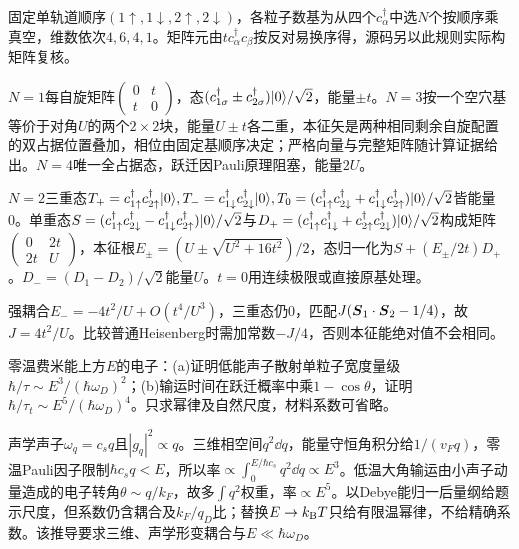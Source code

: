\begin{solution}
固定单轨道顺序$(1\uparrow,1\downarrow,2\uparrow,2\downarrow)$，各粒子数基为从四个$c_\alpha^\dagger$中选$N$个按顺序乘真空，维数依次$4,6,4,1$。矩阵元由$tc_\alpha^\dagger c_\beta$按反对易换序得，源码另以此规则实际构矩阵复核。

$N=1$每自旋矩阵$\left(\begin{smallmatrix}0&t\\t&0\end{smallmatrix}\right)$，态$(c_{1\sigma}^\dagger\pm c_{2\sigma}^\dagger)\lvert 0\rangle/\sqrt2$，能量$\pm t$。$N=3$按一个空穴基等价于对角$U$的两个$2\times2$块，能量$U\pm t$各二重，本征矢是两种相同剩余自旋配置的双占据位置叠加，相位由固定基顺序决定；严格向量与完整矩阵随计算证据给出。$N=4$唯一全占据态，跃迁因Pauli原理阻塞，能量$2U$。

$N=2$三重态$T_+=c_{1\uparrow}^\dagger c_{2\uparrow}^\dagger\lvert 0\rangle,T_-=c_{1\downarrow}^\dagger c_{2\downarrow}^\dagger\lvert 0\rangle,T_0=(c_{1\uparrow}^\dagger c_{2\downarrow}^\dagger+c_{1\downarrow}^\dagger c_{2\uparrow}^\dagger)\lvert 0\rangle/\sqrt2$皆能量0。单重态$S=(c_{1\uparrow}^\dagger c_{2\downarrow}^\dagger-c_{1\downarrow}^\dagger c_{2\uparrow}^\dagger)\lvert 0\rangle/\sqrt2$与$D_+=(c_{1\uparrow}^\dagger c_{1\downarrow}^\dagger+c_{2\uparrow}^\dagger c_{2\downarrow}^\dagger)\lvert 0\rangle/\sqrt2$构成矩阵$\left(\begin{smallmatrix}0&2t\\2t&U\end{smallmatrix}\right)$，本征根$E_\pm=(U\pm\sqrt{U^2+16t^2})/2$，态归一化为$S+(E_\pm/2t)D_+$。$D_-=(D_1-D_2)/\sqrt2$能量$U$。$t=0$用连续极限或直接原基处理。

强耦合$E_-=-4t^2/U+O(t^4/U^3)$，三重态仍0，匹配$J(\boldsymbol{S}_1\cdot\boldsymbol{S}_2-1/4)$，故$J=4t^2/U$。比较普通Heisenberg时需加常数$-J/4$，否则本征能绝对值不会相同。
\end{solution}
\begin{exercise}[原题1(a)--(b)]
零温费米能上方$E$的电子：(a)证明低能声子散射单粒子宽度量级$\hbar/\tau\sim E^3/(\hbar\omega_D)^2$；(b)输运时间在跃迁概率中乘$1-\cos\theta$，证明$\hbar/\tau_t\sim E^5/(\hbar\omega_D)^4$。只求幂律及自然尺度，材料系数可省略。
\end{exercise}
\begin{solution}
声学声子$\omega_q=c_sq$且$|g_q|^2\propto q$。三维相空间$q^2\dd q$，能量守恒角积分给$1/(v_Fq)$，零温Pauli因子限制$\hbar c_sq<E$，所以率$\propto\int_0^{E/\hbar c_s}q^2\dd q\propto E^3$。低温大角输运由小声子动量造成的电子转角$\theta\sim q/k_F$，故多$\int q^2$权重，率$\propto E^5$。以Debye能归一后量纲给题示尺度，但系数仍含耦合及$k_F/q_D$比；替换$E\to k_{\mathrm B} T$只给有限温幂律，不给精确系数。该推导要求三维、声学形变耦合与$E\ll\hbar\omega_D$。
\end{solution}
